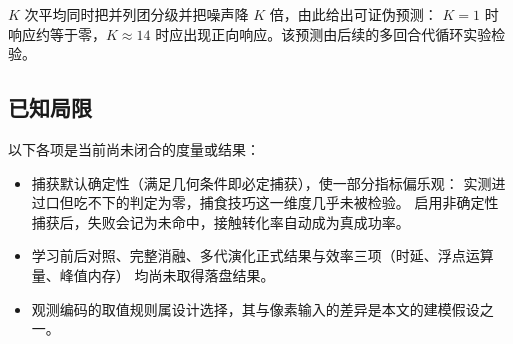 $K$ 次平均同时把并列团分级并把噪声降 $K$ 倍，由此给出可证伪预测：
$K=1$ 时响应约等于零，$K\approx14$ 时应出现正向响应。该预测由后续的多回合代循环实验检验。

\subsection{已知局限}\label{sec:exp-gaps}

以下各项是当前尚未闭合的度量或结果：

\begin{itemize}
  \item 捕获默认确定性（满足几何条件即必定捕获），使一部分指标偏乐观：
        实测进过口但吃不下的判定为零，捕食技巧这一维度几乎未被检验。
        启用非确定性捕获后，失败会记为未命中，接触转化率自动成为真成功率。
  \item 学习前后对照、完整消融、多代演化正式结果与效率三项（时延、浮点运算量、峰值内存）
        均尚未取得落盘结果。
  \item 观测编码的取值规则属设计选择，其与像素输入的差异是本文的建模假设之一。
\end{itemize}
